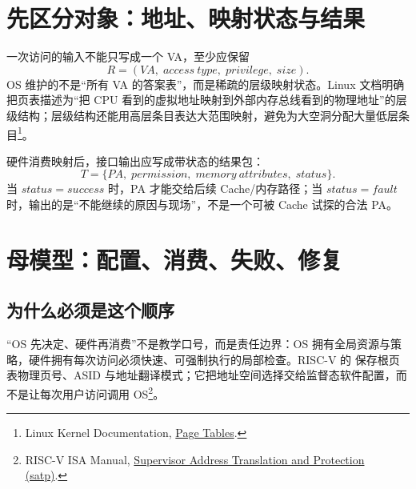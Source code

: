 \documentclass[UTF8,fontset=none,11pt,a4paper]{ctexart}
\begin{document}
\section{先区分对象：地址、映射状态与结果}
一次访问的输入不能只写成一个 VA，至少应保留
\[
  R=(VA,\;access\ type,\;privilege,\;size).
\]
OS 维护的不是“所有 VA 的答案表”，而是稀疏的层级映射状态。Linux 文档明确把页表描述为“把 CPU 看到的虚拟地址映射到外部内存总线看到的物理地址”的层级结构；层级结构还能用高层条目表达大范围映射，避免为大空洞分配大量低层条目\footnote{Linux Kernel Documentation, \href{https://docs.kernel.org/mm/page_tables.html}{Page Tables}.}。

硬件消费映射后，接口输出应写成带状态的结果包：
\[
  T=\{PA,\;permission,\;memory\ attributes,\;status\}.
\]
当 \(status=success\) 时，PA 才能交给后续 Cache/内存路径；当 \(status=fault\) 时，输出的是“不能继续的原因与现场”，不是一个可被 Cache 试探的合法 PA。

\section{母模型：配置、消费、失败、修复}
\begin{center}
\end{center}

\subsection{为什么必须是这个顺序}
“OS 先决定、硬件再消费”不是教学口号，而是责任边界：OS 拥有全局资源与策略，硬件拥有每次访问必须快速、可强制执行的局部检查。RISC-V 的  保存根页表物理页号、ASID 与地址翻译模式；它把地址空间选择交给监督态软件配置，而不是让每次用户访问调用 OS\footnote{RISC-V ISA Manual, \href{https://github.com/riscv/riscv-isa-manual/blob/main/src/priv/supervisor.adoc}{Supervisor Address Translation and Protection (satp)}.}。
\end{document}
